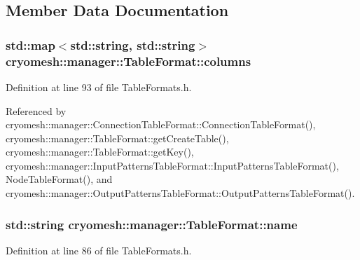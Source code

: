 \subsection{\-Member \-Data \-Documentation}
\hypertarget{structcryomesh_1_1manager_1_1TableFormat_a29ab6f4cfc0c56da1fa461ea665a1b61}{
\subsubsection[{columns}]{\setlength{\rightskip}{0pt plus 5cm}std\-::map$<$std\-::string, std\-::string$>$ {\bf cryomesh\-::manager\-::\-Table\-Format\-::columns}}}\label{structcryomesh_1_1manager_1_1TableFormat_a29ab6f4cfc0c56da1fa461ea665a1b61}


\-Definition at line 93 of file \-Table\-Formats.\-h.



\-Referenced by cryomesh\-::manager\-::\-Connection\-Table\-Format\-::\-Connection\-Table\-Format(), cryomesh\-::manager\-::\-Table\-Format\-::get\-Create\-Table(), cryomesh\-::manager\-::\-Table\-Format\-::get\-Key(), cryomesh\-::manager\-::\-Input\-Patterns\-Table\-Format\-::\-Input\-Patterns\-Table\-Format(), \-Node\-Table\-Format(), and cryomesh\-::manager\-::\-Output\-Patterns\-Table\-Format\-::\-Output\-Patterns\-Table\-Format().

\hypertarget{structcryomesh_1_1manager_1_1TableFormat_ab49912897ccb7fd0f8d42f1cc21332e8}{
\subsubsection[{name}]{\setlength{\rightskip}{0pt plus 5cm}std\-::string {\bf cryomesh\-::manager\-::\-Table\-Format\-::name}}}\label{structcryomesh_1_1manager_1_1TableFormat_ab49912897ccb7fd0f8d42f1cc21332e8}


\-Definition at line 86 of file \-Table\-Formats.\-h.



